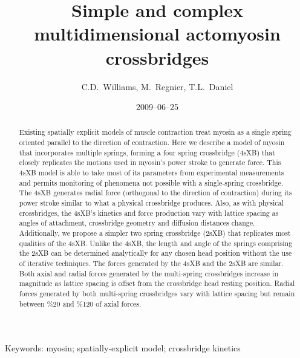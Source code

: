 \documentclass[]{article}
\title{Simple and complex multidimensional actomyosin crossbridges}
\author{C.D.\ Williams, M.\ Regnier, T.L.\ Daniel}
\date{2009--06--25}
\begin{document}
\maketitle{}

\begin{abstract} 
Existing spatially explicit models of muscle contraction treat myosin as a single spring oriented parallel to the direction of contraction.
Here we describe a model of myosin that incorporates multiple springs, forming a four spring crossbridge (4sXB) that closely replicates the motions used in myosin's power stroke to generate force.
This 4sXB model is able to take most of its parameters from experimental measurements and permits monitoring of phenomena not possible with a single-spring crossbridge.
The 4sXB generates radial force (orthogonal to the direction of contraction) during its power stroke similar to what a physical crossbridge produces.
Also, as with physical crossbridges, the 4sXB's kinetics and force production vary with lattice spacing as angles of attachment, crossbridge geometry and diffusion distances change.
Additionally, we propose a simpler two spring crossbridge (2sXB) that replicates most qualities of the 4sXB.
Unlike the 4sXB, the length and angle of the springs comprising the 2sXB can be determined analytically for any chosen head position without the use of iterative techniques.
The forces generated by the 4sXB and the 2sXB are similar.
Both axial and radial forces generated by the multi-spring crossbridges increase in magnitude as lattice spacing is offset from the crossbridge head resting position.
Radial forces generated by both multi-spring crossbridges vary with lattice spacing but remain between \%20 and \%120 of axial forces.
\end{abstract}

Keywords: myosin; spatially-explicit model; crossbridge kinetics

\end{document}

